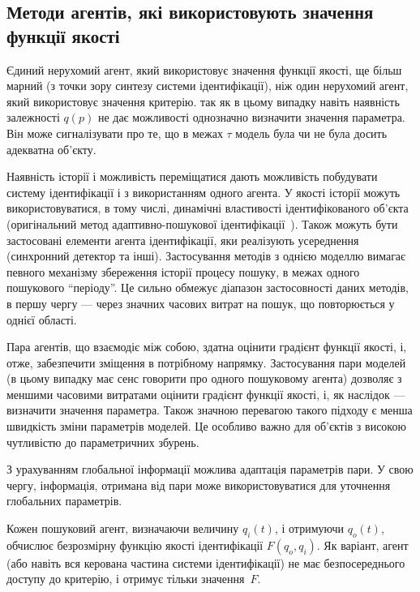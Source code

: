 
\subsection{Методи агентів, які використовують значення функції якості}%

Єдиний нерухомий агент, який використовує значення функції якості, ще більш марний
(з точки зору синтезу системи ідентифікації), ніж один нерухомий агент, який
використовує значення критерію.
%
так як в цьому випадку навіть наявність залежності
$q(p)$ не дає можливості однозначно визначити значення
параметра. Він може сигналізувати про те, що в межах \(\tau \) модель
була чи не була досить адекватна об'єкту.

Наявність історії і можливість переміщатися дають можливість
побудувати систему ідентифікації і з використанням одного агента.
У якості історії
можуть використовуватися, в тому числі, динамічні властивості
ідентифікованого об'єкта
(оригінальний метод адаптивно-пошукової ідентифікації~\cite{mich_92,mich_92}).
Також можуть бути застосовані елементи агента
ідентифікації, яки реалізують усереднення (синхронний детектор та інші).
Застосування методів з однією моделлю вимагає певного механізму
збереження історії процесу пошуку, в межах
одного пошукового ``періоду''. Це сильно обмежує діапазон
застосовності даних методів, в першу чергу --- через значних
часових витрат на пошук, що повторюється у однієї області.

Пара агентів, що взаємодіє між собою, здатна оцінити градієнт функції якості,
і, отже, забезпечити зміщення в потрібному напрямку.
Застосування пари моделей \cite{atu_asau3} (в цьому випадку має сенс
говорити про одного пошуковому агента) дозволяє з меншими
часовими витратами оцінити градієнт функції якості, і,
як наслідок --- визначити значення параметра. Також значною
перевагою такого підходу є менша швидкість зміни параметрів
моделей. Це особливо важно для об'єктів з високою чутливістю
до параметричних збурень.

З урахуванням глобальної інформації можлива адаптація
параметрів пари. У свою чергу, інформація, отримана від пари
може використовуватися для уточнення глобальних параметрів.

Кожен пошуковий агент, визначаючи величину $q_{i}(t)$, і отримуючи $q_o(t)$,
обчислює безрозмірну функцію якості ідентифікації $F (q_o, q_i)$. Як
варіант, агент (або навіть вся керована частина системи ідентифікації) не має
безпосереднього доступу до критерію, і отримує тільки значення~$F$.

